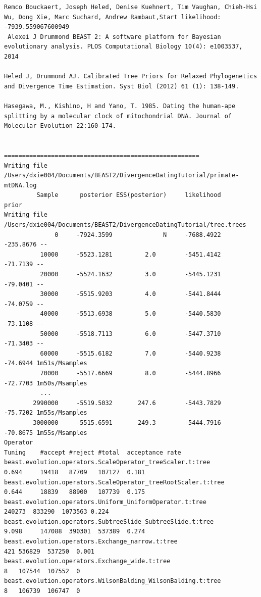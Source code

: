 \documentclass[11pt]{article}
\theoremstyle{plain}%
\theoremstyle{definition}
\theoremstyle{remark}
\begin{document}
{\begin{verbatim}
Remco Bouckaert, Joseph Heled, Denise Kuehnert, Tim Vaughan, Chieh-Hsi Wu, Dong Xie, Marc Suchard, Andrew Rambaut,Start likelihood: -7939.559067600949 
 Alexei J Drummond BEAST 2: A software platform for Bayesian evolutionary analysis. PLOS Computational Biology 10(4): e1003537, 2014

Heled J, Drummond AJ. Calibrated Tree Priors for Relaxed Phylogenetics and Divergence Time Estimation. Syst Biol (2012) 61 (1): 138-149.

Hasegawa, M., Kishino, H and Yano, T. 1985. Dating the human-ape splitting by a molecular clock of mitochondrial DNA. Journal of Molecular Evolution 22:160-174.


======================================================
Writing file /Users/dxie004/Documents/BEAST2/DivergenceDatingTutorial/primate-mtDNA.log
         Sample      posterior ESS(posterior)     likelihood          prior
Writing file /Users/dxie004/Documents/BEAST2/DivergenceDatingTutorial/tree.trees
              0     -7924.3599              N     -7688.4922      -235.8676 --
          10000     -5523.1281         2.0        -5451.4142       -71.7139 --
          20000     -5524.1632         3.0        -5445.1231       -79.0401 --
          30000     -5515.9203         4.0        -5441.8444       -74.0759 --
          40000     -5513.6938         5.0        -5440.5830       -73.1108 --
          50000     -5518.7113         6.0        -5447.3710       -71.3403 --
          60000     -5515.6182         7.0        -5440.9238       -74.6944 1m51s/Msamples
          70000     -5517.6669         8.0        -5444.8966       -72.7703 1m50s/Msamples
          ...
        2990000     -5519.5032       247.6        -5443.7829       -75.7202 1m55s/Msamples
        3000000     -5515.6591       249.3        -5444.7916       -70.8675 1m55s/Msamples
Operator                                                              Tuning	#accept	#reject	#total	acceptance rate
beast.evolution.operators.ScaleOperator_treeScaler.t:tree             0.694 	19418	87709	107127	0.181 
beast.evolution.operators.ScaleOperator_treeRootScaler.t:tree         0.644 	18839	88900	107739	0.175 
beast.evolution.operators.Uniform_UniformOperator.t:tree                    	240273	833290	1073563	0.224 
beast.evolution.operators.SubtreeSlide_SubtreeSlide.t:tree            9.098 	147088	390301	537389	0.274 
beast.evolution.operators.Exchange_narrow.t:tree                            	421	536829	537250	0.001 
beast.evolution.operators.Exchange_wide.t:tree                              	8	107544	107552	0 
beast.evolution.operators.WilsonBalding_WilsonBalding.t:tree                	8	106739	106747	0 

\end{verbatim}}
\end{document}

